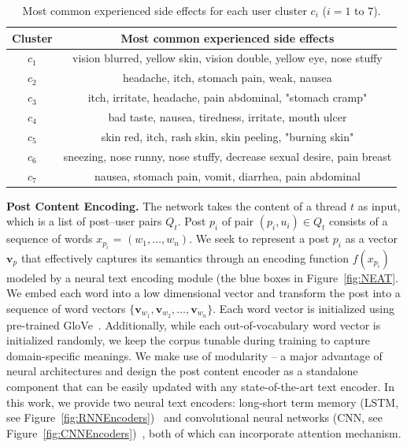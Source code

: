 \documentclass{bmcart}
\begin{document}
\begin{table}[]
    \centering
    \begin{tabular}{|c|c|} \hline
        Cluster & Most common experienced side effects \\ \hline \hline
        $c_{1}$ & vision blurred, yellow skin, vision double, yellow eye, nose stuffy \\ \hline
        $c_{2}$ & headache, itch, stomach pain, weak, nausea \\ \hline
        $c_{3}$ & itch, irritate, headache, pain abdominal, "stomach cramp" \\ \hline
        $c_{4}$ & bad taste, nausea, tiredness, irritate, mouth ulcer \\ \hline
        $c_{5}$ & skin red, itch, rash skin, skin peeling, "burning skin" \\ \hline
        $c_{6}$ & sneezing, nose runny, nose stuffy, decrease sexual desire, pain breast \\ \hline
        $c_{7}$ & nausea, stomach pain, vomit, diarrhea, pain abdominal \\ \hline
    \end{tabular}
    \caption{Most common experienced side effects for each user cluster $c_{i}$ ($i=1$ to $7$).}
    \label{table:cluster_results}
\end{table}

\textbf{Post Content Encoding.} The network takes the content of a
thread $t$ as input, which is a list of post--user pairs $Q_t$.  Post
$p_i$ of pair $\left(p_i, u_i\right)\in Q_t$ consists of a sequence of words $x_{p_i}$ = $(w_1, \ldots, w_n)$.
We seek to represent a post $p_{i}$ as a vector $\boldsymbol{v}_{p}$ 
that effectively captures its semantics through an encoding function $f(x_{p_i})$ modeled by a neural text encoding module (the blue boxes in Figure~\ref{fig:NEAT}. 
We embed each word into a low dimensional vector 
and transform the post into a sequence of word vectors
$\{\boldsymbol{v}_{w_1}, \boldsymbol{v}_{w_2},\ldots,
\boldsymbol{v}_{w_n}\}$. Each word vector is initialized using pre-trained GloVe~\cite{pennington2014glove}. Additionally, while each out-of-vocabulary word vector is initialized randomly, we keep the corpus tunable during training to capture domain-specific meanings. We make use of modularity -- a major advantage of neural architectures and design the post content encoder as a standalone component that can be easily updated with any state-of-the-art text encoder. In this work, we provide two neural text encoders: 
long-short term memory (LSTM, see Figure~\ref{fig:RNNEncoders})~\cite{hochreiter1997long} 
and convolutional neural networks 
(CNN, see Figure~\ref{fig:CNNEncoders})~\cite{kim2014convolutional}, 
both of which can incorporate attention mechanism.
\end{document}
